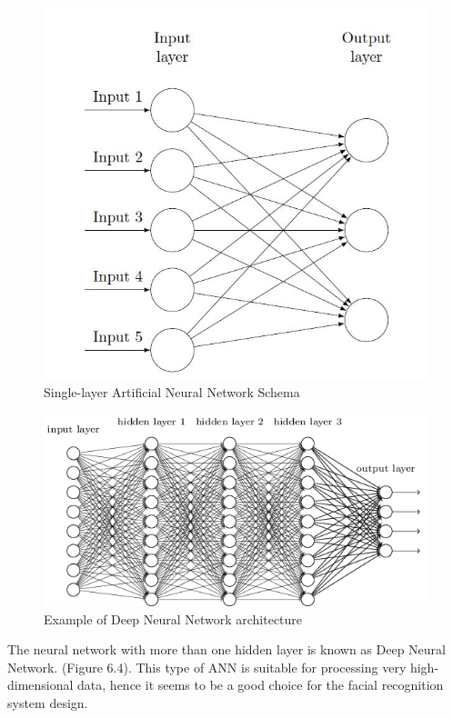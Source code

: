 \begin{figure}[H]
\centering
\includegraphics[scale=0.65]{single_ANN_schema.jpg}
\caption{Single-layer Artificial Neural Network Schema}
\end{figure} 

\begin{figure}[H]
\centering
\includegraphics[scale=0.65]{img/neural_net.png}
\caption{Example of Deep Neural Network architecture}
\end{figure}

The neural network with more than one hidden layer is known as Deep Neural Network. (Figure 6.4). This type of ANN is suitable for processing very high-dimensional data, hence it seems to be a good choice for the facial recognition system design. 



